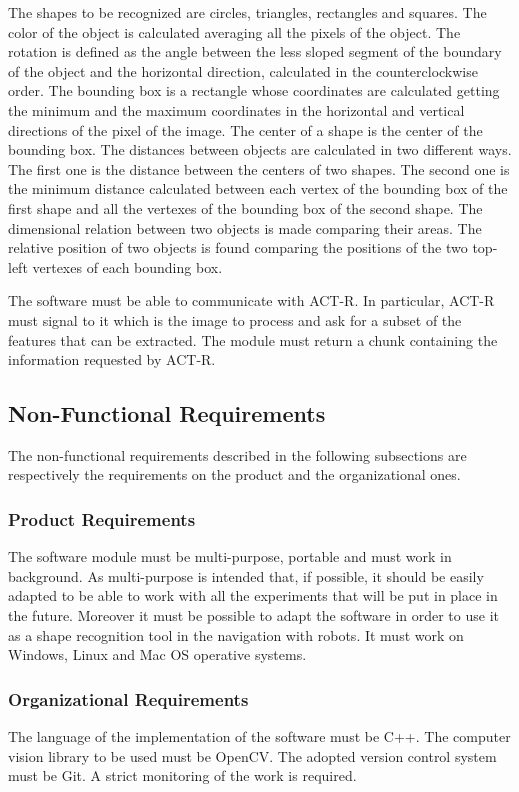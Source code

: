 		The shapes to be recognized are circles, triangles, rectangles and squares. 
		The color of the object is calculated averaging all the pixels of the object.
		The rotation is defined as the angle between the less sloped segment of the boundary of the object and the horizontal direction, calculated in the counterclockwise order.
		The bounding box is a rectangle whose coordinates are calculated getting the minimum and the maximum coordinates in the horizontal and vertical directions of the pixel of the image. 
		The center of a shape is the center of the bounding box.
		The distances between objects are calculated in two different ways. The first one is the distance between the centers of two shapes. The second one is the minimum distance calculated between each vertex of the bounding box of the first shape and all the vertexes of the bounding box of the second shape.
		The dimensional relation between two objects is made comparing their areas. 
		The relative position of two objects is found comparing the positions of the two top-left vertexes of each bounding box.

		The software must be able to communicate with ACT-R. 
		In particular, ACT-R must signal to it which is the image to process and ask for a subset of the features that can be extracted. The module must return a chunk containing the information requested by ACT-R.

		\subsection{Non-Functional Requirements}
		The non-functional requirements described in the following subsections are respectively the requirements on the product and the organizational ones.

			\subsubsection{Product Requirements}
			The software module must be multi-purpose, portable and must work in background.
			As multi-purpose is intended that, if possible, it should be easily adapted to be able to work with all the experiments that will be put in place in the future. Moreover it must be possible to adapt the software in order to use it as a shape recognition tool in the navigation with robots. %
			It must work on Windows, Linux and Mac OS operative systems.
	
			\subsubsection{Organizational Requirements}
			The language of the implementation of the software must be C++. 
			The computer vision library to be used must be OpenCV.
			The adopted version control system must be Git.
			A strict monitoring of the work is required.


